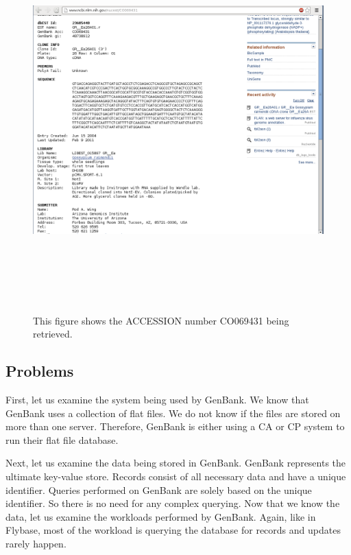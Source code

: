 \documentclass[12pt]{ucthesis}
\newcommand{\captionfonts}{\small\bf\ssp}
\begin{document}
\begin{figure}[H]
\begin{center}
\includegraphics[height=140mm, angle=90]{genbank-screenshot.png}
\captionfonts
\caption[GenBank screenshot]{This figure shows the ACCESSION number CO069431 being retrieved.}
\label{fig:genbank-ss}
\end{center}
\end{figure}

\subsection{Problems}
First, let us examine the system being used by GenBank. We know that GenBank uses a collection of flat files.
We do not know if the files are stored on more than one server. Therefore, GenBank is either using a CA or
CP system to run their flat file database.

Next, let us examine the data being stored in GenBank. GenBank represents the ultimate key-value store. Records consist of all necessary data and have a unique identifier. Queries performed on GenBank are solely based on the unique identifier. So there is no need for any complex querying. Now that we know the data, let us examine the workloads performed by GenBank. Again, like in Flybase, most
of the workload is querying the database for records and updates rarely happen. 
\end{document}
